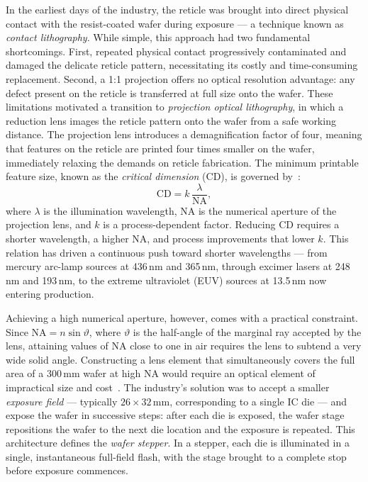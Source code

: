 In the earliest days of the industry, the reticle was brought into direct physical contact with the resist-coated wafer during exposure — a technique known as \textit{contact lithography}. While simple, this approach had two fundamental shortcomings. First, repeated physical contact progressively contaminated and damaged the delicate reticle pattern, necessitating its costly and time-consuming replacement. Second, a 1:1 projection offers no optical resolution advantage: any defect present on the reticle is transferred at full size onto the wafer. These limitations motivated a transition to \textit{projection optical lithography}, in which a reduction lens images the reticle pattern onto the wafer from a safe working distance. The projection lens introduces a demagnification factor of four, meaning that features on the reticle are printed four times smaller on the wafer, immediately relaxing the demands on reticle fabrication. The minimum printable feature size, known as the \textit{critical dimension} (CD), is governed by~\cite{Schmidt2012_UltraPrecision}:
\begin{equation}
    \mathrm{CD} = k\,\frac{\lambda}{\mathrm{NA}},
    \label{eq:rayleigh}
\end{equation}
where $\lambda$ is the illumination wavelength, $\mathrm{NA}$ is the numerical aperture of the projection lens, and $k$ is a process-dependent factor. Reducing CD requires a shorter wavelength, a higher NA, and process improvements that lower $k$. This relation has driven a continuous push toward shorter wavelengths — from mercury arc-lamp sources at 436\,nm and 365\,nm, through excimer lasers at 248\,nm and 193\,nm, to the extreme ultraviolet (EUV) sources at 13.5\,nm now entering production.

Achieving a high numerical aperture, however, comes with a practical constraint. Since $\mathrm{NA} = n\sin\vartheta$, where $\vartheta$ is the half-angle of the marginal ray accepted by the lens, attaining values of NA close to one in air requires the lens to subtend a very wide solid angle. Constructing a lens element that simultaneously covers the full area of a 300\,mm wafer at high NA would require an optical element of impractical size and cost~\cite{Schmidt2012_UltraPrecision}. The industry's solution was to accept a smaller \textit{exposure field} — typically $26 \times 32$\,mm, corresponding to a single IC die — and expose the wafer in successive steps: after each die is exposed, the wafer stage repositions the wafer to the next die location and the exposure is repeated. This architecture defines the \textit{wafer stepper}. In a stepper, each die is illuminated in a single, instantaneous full-field flash, with the stage brought to a complete stop before exposure commences.

